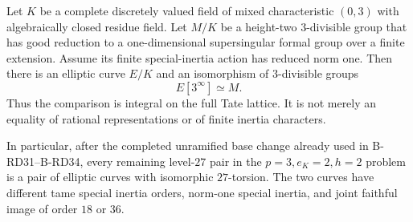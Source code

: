 \begin{proposition}
\label{prop:B-RD35}
Let $K$ be a complete discretely valued field of mixed characteristic
$(0,3)$ with algebraically closed residue field. Let $M/K$ be a
height-two $3$-divisible group that has good reduction to a
one-dimensional supersingular formal group over a finite extension.
Assume its finite special-inertia action has reduced norm one.
Then there is an elliptic curve $E/K$ and an isomorphism of
$3$-divisible groups
\[
                             E[3^\infty]\simeq M.
                                                        \tag{B-RD35.3}
\]
Thus the comparison is integral on the full Tate lattice. It is not
merely an equality of rational representations or of finite inertia
characters.

In particular, after the completed unramified base change already
used in B-RD31--B-RD34, every remaining level-$27$ pair in the
$p=3,e_K=2,h=2$ problem is a pair of elliptic curves with
isomorphic $27$-torsion. The two curves have different tame special
inertia orders, norm-one special inertia, and joint faithful image
of order $18$ or $36$.
\end{proposition}

